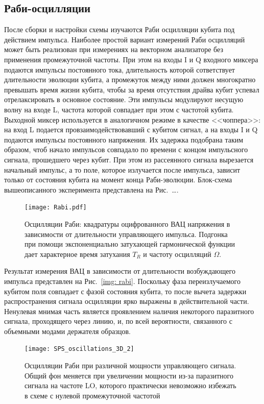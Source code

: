 \subsection{Раби-осцилляции}
После сборки и настройки схемы изучаются Раби осцилляции кубита под действием импульса. Наиболее простой вариант измерений Раби осцилляций может быть реализован при измерениях на векторном анализаторе без применения промежуточной частоты. При этом на входы I и Q входного миксера подаются импульсы постоянного тока, длительность которой сответствует длительности эволюции кубита, а промежуток между ними должен многократно превышать время жизни кубита, чтобы за время отсутствия драйва кубит     успевал отрелаксировать в основное состояние. Эти импульсы модулируют несущую волну на входе L, частота которой совпадает при этом с частотой кубита. Выходной миксер используется в аналогичном режиме в качестве <<чоппера>>: на вход L подается провзаимодействовавший с кубитом сигнал, а на входы I и Q подаются импульсы постоянного напряжения. Их задержка подобрана таким образом, чтоб начало импульсов совпадало по времени с концом импульсного сигнала, прошедшего через кубит. При этом из рассеянного сигнала вырезается начальный импульс, а то поле, которое излучается после импульса, зависит только от состояния кубита на момент конца Раби-эволюции. Блок-схема вышеописанного эксперимента представлена на Рис.~\ldots.
\begin{figure}
	\centering
	\texttt{[image: Rabi.pdf]}
	\caption[Раби осцилляции кубита в линии, полученные при измерении рассеянного поля]{Осцилляции Раби: квадратуры оцифрованного ВАЦ напряжения в зависимости от длительности управляющего импульса. Подгонка при помощи экспоненциально затухающей гармонической функции дает характерное время затухания $T_R$ и частоту осцилляций $\Omega$.}
	\label{fig: rabi_ocs }
\end{figure} 
Результат измерения ВАЦ в зависимости от длительности возбуждающего импульса представлен на Рис.~\ref{img: rabi}. Поскольку фаза переизлучаемого кубитом поля совпадает с фазой состояния кубита, то после вычета задержки распространения сигнала осцилляции ярко выражены в действительной части. Ненулевая мнимая часть является проявлением наличия некоторого паразитного сигнала, проходящего через линию,  и, по всей вероятности, связанного с объемными модами держателя образцов.  
\begin{figure}
	\centering
	\texttt{[image: SPS\_oscillations\_3D\_2]}
	\caption[Зависимость Раби осцилляций от мощности сигнала]{Осцилляции Раби при различной мощности управляющего сигнала. Общий фон меняется при увеличении мощности из-за паразитного сигнала на частоте LO, которого практически невозможно избежать в схеме с нулевой промежуточной частотой}
	\label{fig: rabi_ocs}
\end{figure} 
